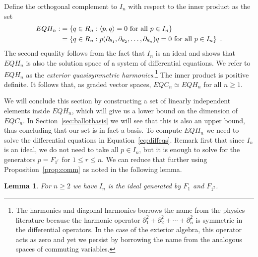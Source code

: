 \documentclass[submission]{FPSAC2023}
\newtheorem{lemma}[theorem]{Lemma}
\theoremstyle{definition}
\numberwithin{equation}{section}
\begin{document}
Define the orthogonal complement to $I_n$ with respect to the inner product as
the set
\begin{align}
EQH_n :&= \left\{ q \in R_n : \left< p, q \right> = 0 \hbox{ for all } p \in I_n \right\}
\label{eq:set1}\\
  &=\left\{ q \in R_n : p(\partial_{\theta_1}, \partial_{\theta_2}, \ldots, \partial_{\theta_n})
q= 0 \hbox{ for all } p \in I_n \right\}~.\label{eq:diffeqs}
\end{align}
The second equality follows from the fact that $I_n$ is an ideal
and shows that $EQH_n$ is also the solution space of
a system of differential equations.  
We refer to $EQH_n$ as the \emph{exterior quasisymmetric harmonics}.\footnote{
The harmonics and diagonal harmonics borrows the name from the physics literature
because the harmonic operator $\partial_1^2 + \partial_2^2 + \cdots + \partial_n^2$
is symmetric in the differential operators.  In the case of the exterior algebra,
this operator acts as zero and yet we persist by borrowing the name from the
analogous spaces of commuting variables.
} 
The inner product is positive definite. It follows that, as graded vector spaces, $
EQC_n \simeq EQH_n$ for all $n \ge 1$.

We will conclude this section  by constructing a set of linearly independent elements inside $EQH_n$, which will
give us a lower  bound on the dimension of $EQC_n$. In Section~\ref{sec:ballotbasis} we will see that this is also an upper bound,
thus concluding that our  set is in fact a basis. To compute $EQH_n$ we need to solve the differential equations in Equation~\eqref{eq:diffeqs}.
Remark first  that since $I_n$ is an ideal, we do not need to take all $p\in I_n$, but it is enough to solve for the generators $p=F_{1^r}$ for  $1\le r\le n$.
We can reduce that further using Proposition~\ref{prop:comm} as noted in the following lemma.
\begin{lemma}\label{lem:idealgen}
For $n\ge 2$ we have $I_n$ is the ideal generated by $F_1$ and $F_{1^2}$.
\end{lemma}
\end{document}
